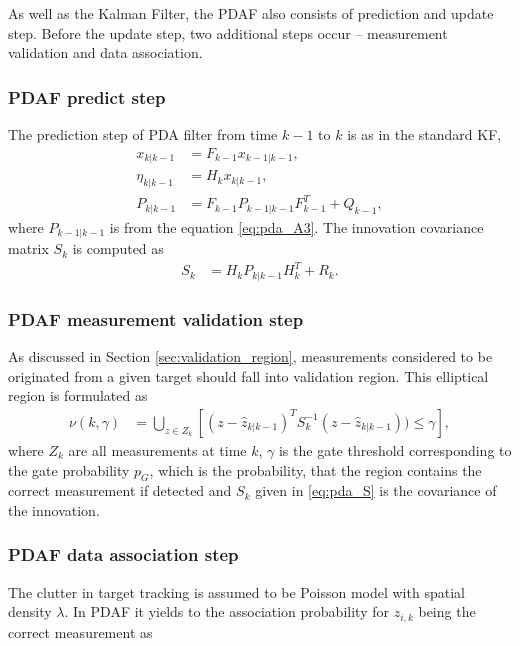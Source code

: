 As well as the Kalman Filter, the PDAF also consists of prediction and update step. Before the update step, two
additional steps occur -- measurement validation and data association.
 \subsubsection{PDAF predict step}
The prediction step of PDA filter from time $k-1$ to $k$ is as in the standard KF,
\begin{align}
    x_{k|k-1} &= F_{k-1}x_{k-1|k-1},\\
    \eta_{k|k-1} &= H_k x_{k|k-1},\\
    P_{k|k-1} &= F_{k-1} P_{k-1|k-1} F_{k-1}^T + Q_{k-1},
\end{align}
where $P_{k-1|k-1}$ is from the equation \eqref{eq:pda_A3}. The innovation covariance matrix $S_k$ is computed as
\begin{align}
    S_k &= H_{k} P_{k|k-1} H_{k}^T + R_{k}. \label{eq:pda_S}
\end{align}

\subsubsection{PDAF measurement validation step}
As discussed in Section \ref{sec:validation_region}, measurements considered to be originated from a given target
should fall into validation region. This elliptical region is formulated as
\begin{align}
    \nu(k,\gamma) &= \bigcup_{z \in Z_k}[(z - \hat{z}_{k|k-1})^T S_k^{-1} (z - \hat{z}_{k|k-1})) \leq \gamma], \label {eq:validation_region}
\end{align}
where $Z_k$ are all measurements at time $k$, $\gamma$ is the gate threshold corresponding to the gate probability $p_G$, which is the probability, that the region contains the correct measurement if detected and $S_k$ given in \eqref{eq:pda_S} is the covariance of the innovation.

\subsubsection{PDAF data association step}
The clutter in target tracking is assumed to be Poisson model with spatial density $\lambda$. In PDAF it yields to the association probability for $z_{i,k}$ being the correct measurement as

\vspace{-0.5cm}

